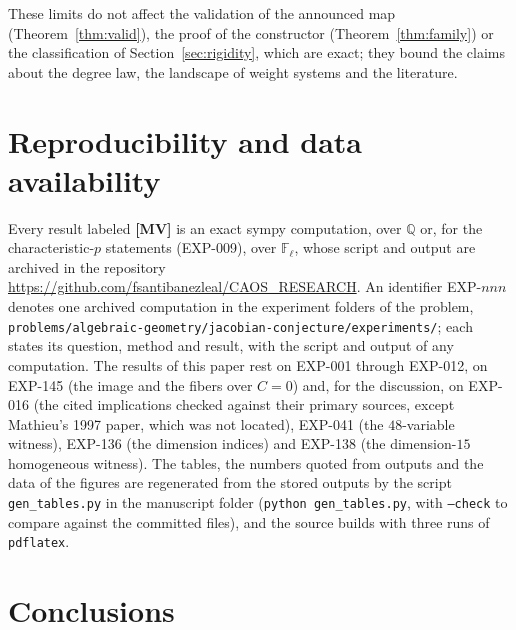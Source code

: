 \documentclass[11pt]{article}
\theoremstyle{definition}
\theoremstyle{remark}
\newcommand{\Q}{\mathbb{Q}}
\newcommand{\MV}{\textbf{[MV]}}
\begin{document}
These limits do not affect the validation of the announced map (Theorem~\ref{thm:valid}), the proof of the constructor (Theorem~\ref{thm:family}) or the classification of Section~\ref{sec:rigidity}, which are exact; they bound the claims about the degree law, the landscape of weight systems and the literature.

\section{Reproducibility and data availability}\label{sec:repro}

{\sloppy Every result labeled \MV{} is an exact sympy computation, over $\Q$ or, for the characteristic-$p$ statements (EXP-009), over $\mathbb{F}_\ell$, whose script and output are archived in the repository \url{https://github.com/fsantibanezleal/CAOS_RESEARCH}. An identifier EXP-$nnn$ denotes one archived computation in the experiment folders of the problem, \nolinkurl{problems/algebraic-geometry/jacobian-conjecture/experiments/}; each states its question, method and result, with the script and output of any computation. The results of this paper rest on EXP-001 through EXP-012, on EXP-145 (the image and the fibers over $C = 0$) and, for the discussion, on EXP-016 (the cited implications checked against their primary sources, except Mathieu's 1997 paper, which was not located), EXP-041 (the $48$-variable witness), EXP-136 (the dimension indices) and EXP-138 (the dimension-$15$ homogeneous witness). The tables, the numbers quoted from outputs and the data of the figures are regenerated from the stored outputs by the script \texttt{gen\_tables.py} in the manuscript folder (\texttt{python gen\_tables.py}, with \texttt{--check} to compare against the committed files), and the source builds with three runs of \texttt{pdflatex}.\par}

\section{Conclusions}\label{sec:conclusions}
\end{document}

